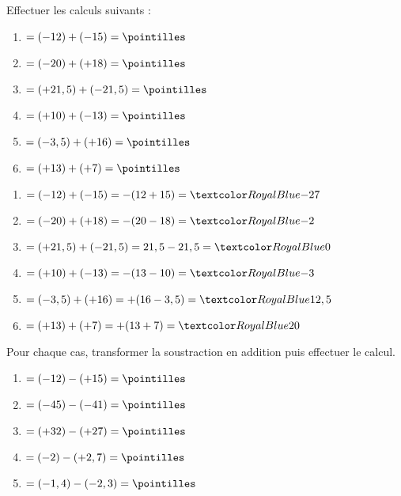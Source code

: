 \begin{Maquette}[Fiche,CorrigeFin,Colonnes=2]{}
   
   \begin{multicols}{2}

      \begin{exercice}[SLF] %
         Effectuer les calculs suivants :
         \begin{enumerate}[label=\Alph*]
            \item $=(-12)+(-15) =\pointilles$
            \item $=(-20)+(+18) =\pointilles$
            \item $=(+21,5)+(-21,5) =\pointilles$
            \item $=(+10)+(-13) =\pointilles$
            \item $=(-3,5)+(+16) =\pointilles$
            \item $=(+13)+(+7) =\pointilles$
         \end{enumerate}
      \end{exercice}
      
      \begin{Solution}
         \begin{enumerate}[label=\Alph*]
            \item $=(-12)+(-15) =-(12+15) =\cor{-27}$
            \item $=(-20)+(+18) =-(20-18) =\cor{-2}$
            \item $=(+21,5)+(-21,5) =21,5-21,5 =\cor{0}$
            \item $=(+10)+(-13) =-(13-10) =\cor{-3}$
            \item $=(-3,5)+(+16) =+(16-3,5) =\cor{12,5}$
            \item $=(+13)+(+7) =+(13+7) =\cor{20}$
         \end{enumerate}
      \end{Solution}
      
      
      \begin{exercice}[SLF] %
         Pour chaque cas, transformer la soustraction en addition puis effectuer le calcul.
         \begin{enumerate}[label=\Alph*]
            \item $=(-12)-(+15) =\pointilles$
            \item $=(-45)-(-41) =\pointilles$
            \item $=(+32)-(+27) =\pointilles$
            \item $=(-2)-(+2,7) =\pointilles$
            \item $=(-1,4)-(-2,3) =\pointilles$
         \end{enumerate}
      \end{exercice}
      

\end{multicols}
\end{Maquette}
